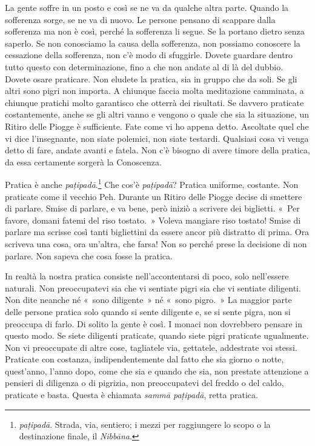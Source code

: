 La gente soffre in un posto e così se ne va da qualche altra parte.
Quando la sofferenza sorge, se ne va di nuovo. Le persone pensano di
scappare dalla sofferenza ma non è così, perché la sofferenza li segue.
Se la portano dietro senza saperlo. Se non conosciamo la causa della
sofferenza, non possiamo conoscere la cessazione della sofferenza, non
c'è modo di sfuggirle. Dovete guardare dentro tutto questo con
determinazione, fino a che non andate al di là del dubbio. Dovete osare
praticare. Non eludete la pratica, sia in gruppo che da soli. Se gli
altri sono pigri non importa. A chiunque faccia molta meditazione
camminata, a chiunque pratichi molto garantisco che otterrà dei
risultati. Se davvero praticate costantemente, anche se gli altri vanno
e vengono o quale che sia la situazione, un Ritiro delle Piogge è
sufficiente. Fate come vi ho appena detto. Ascoltate quel che vi dice
l'insegnante, non siate polemici, non siate testardi. Qualsiasi cosa vi
venga detto di fare, andate avanti e fatela. Non c'è bisogno di avere
timore della pratica, da essa certamente sorgerà la Conoscenza.

Pratica è anche \emph{paṭipadā}.\footnote{\emph{paṭipadā}. Strada, via,
  sentiero; i mezzi per raggiungere lo scopo o la destinazione finale,
  il \emph{Nibbāna}.} Che cos'è \emph{paṭipadā}? Pratica uniforme,
costante. Non praticate come il vecchio Peh. Durante un Ritiro delle
Piogge decise di smettere di parlare. Smise di parlare, e va bene, però
iniziò a scrivere dei biglietti. «~Per favore, domani fatemi del riso
tostato.~» Voleva mangiare riso tostato! Smise di parlare ma scrisse
così tanti bigliettini da essere ancor più distratto di prima. Ora
scriveva una cosa, ora un'altra, che farsa! Non so perché prese la
decisione di non parlare. Non sapeva che cosa fosse la pratica.

In realtà la nostra pratica consiste nell'accontentarsi di poco, solo
nell'essere naturali. Non preoccupatevi sia che vi sentiate pigri sia
che vi sentiate diligenti. Non dite neanche né «~sono diligente~» né
«~sono pigro.~» La maggior parte delle persone pratica solo quando si
sente diligente e, se si sente pigra, non si preoccupa di farlo. Di
solito la gente è così. I monaci non dovrebbero pensare in questo modo.
Se siete diligenti praticate, quando siete pigri praticate ugualmente.
Non vi preoccupate di altre cose, tagliatele via, gettatele, addestrate
voi stessi. Praticate con costanza, indipendentemente dal fatto che sia
giorno o notte, quest'anno, l'anno dopo, come che sia e quando che sia,
non prestate attenzione a pensieri di diligenza o di pigrizia, non
preoccupatevi del freddo o del caldo, praticate e basta. Questa è
chiamata \emph{sammā paṭipadā}, retta pratica.

